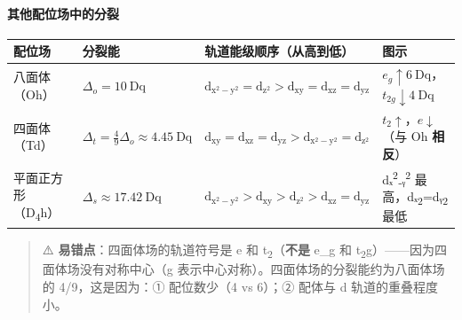 \documentclass[a4paper,11pt]{ctexart}
\newcounter{none}
\begin{document}
\paragraph{其他配位场中的分裂}\label{ux5176ux4ed6ux914dux4f4dux573aux4e2dux7684ux5206ux88c2}

{\def\LTcaptype{none} %
\begin{longtable}[]{@{}
  >{\centering\arraybackslash}p{}
  >{\centering\arraybackslash}p{}
  >{\raggedright\arraybackslash}p{}
  >{\centering\arraybackslash}p{}@{}}
\toprule\noalign{}
\begin{minipage}[b]{\linewidth}\centering
配位场
\end{minipage} & \begin{minipage}[b]{\linewidth}\centering
分裂能
\end{minipage} & \begin{minipage}[b]{\linewidth}\raggedright
轨道能级顺序（从高到低）
\end{minipage} & \begin{minipage}[b]{\linewidth}\centering
图示
\end{minipage} \\
\midrule\noalign{}
\endhead
\bottomrule\noalign{}
\endlastfoot
八面体（Oh） & \(\Delta_o = 10\ \mathrm{Dq}\) & \(\mathrm{d_{x^2-y^2} = d_{z^2} > d_{xy} = d_{xz} = d_{yz}}\) & \(e_g \uparrow 6\ \mathrm{Dq}\)，\(t_{2g} \downarrow 4\ \mathrm{Dq}\) \\
四面体（Td） & \(\Delta_t = \frac{4}{9}\Delta_o \approx 4.45\ \mathrm{Dq}\) & \(\mathrm{d_{xy} = d_{xz} = d_{yz} > d_{x^2-y^2} = d_{z^2}}\) & \(t_2 \uparrow\)，\(e \downarrow\)（与 Oh \textbf{相反}） \\
平面正方形（D\textsubscript{4}h） & \(\Delta_s \approx 17.42\ \mathrm{Dq}\) & \(\mathrm{d_{x^2-y^2} > d_{xy} > d_{z^2} > d_{xz} = d_{yz}}\) & dₓ\textsuperscript{2}₋ᵧ\textsuperscript{2} 最高，dₓ\textsubscript{2}=dᵧ\textsubscript{2} 最低 \\
\end{longtable}
}

\begin{quote}
⚠️ \textbf{易错点}：四面体场的轨道符号是 e 和 t\textsubscript{2}（\textbf{不是} e\_g 和 t\textsubscript{2}g）------因为四面体场没有对称中心（g 表示中心对称）。四面体场的分裂能约为八面体场的 4/9，这是因为：① 配位数少（4 vs 6）；② 配体与 d 轨道的重叠程度小。
\end{quote}
\end{document}
